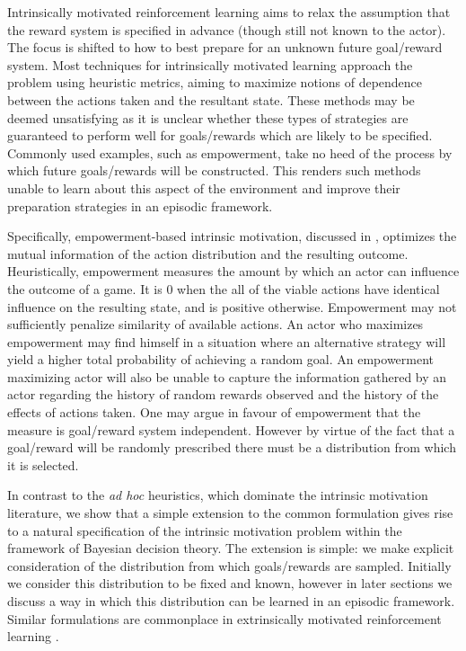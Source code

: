 \documentclass{article}
\begin{document}
Intrinsically motivated reinforcement learning aims to relax the assumption that the reward system is specified in advance (though still not known to the actor). The focus is shifted to how to best prepare for an unknown future goal/reward system. Most techniques for intrinsically motivated learning approach the problem using heuristic metrics, aiming to maximize notions of dependence between the actions taken and the resultant state. These methods may be deemed unsatisfying as it is unclear whether these types of strategies are guaranteed to perform well for goals/rewards which are likely to be specified. Commonly used examples, such as empowerment, take no heed of the process by which future goals/rewards will be constructed. This renders such methods unable to learn about this aspect of the environment and improve their preparation strategies in an episodic framework.    

Specifically, empowerment-based intrinsic motivation, discussed in \citep{mohamed2015variational}, optimizes the mutual information of the action distribution and the resulting outcome. Heuristically, empowerment measures the amount by which an actor can influence the outcome of a game. It is $0$ when the all of the viable actions have identical influence on the resulting state, and is positive otherwise. Empowerment may not sufficiently penalize similarity of available actions. An actor who maximizes empowerment may find himself in a situation where an alternative strategy will yield a higher total probability of achieving a random goal. An empowerment maximizing actor will also be unable to capture the information gathered by an actor regarding the history of random rewards observed and the history of the effects of actions taken. One may argue in favour of empowerment that the measure is goal/reward system independent. However by virtue of the fact that a goal/reward will be randomly prescribed there must be a distribution from which it is selected.  

In contrast to the \textit{ad hoc} heuristics, which dominate the intrinsic motivation literature, we show that a simple extension to the common formulation gives rise to a natural specification of the intrinsic motivation problem within the framework of Bayesian decision theory. The extension is simple: we make explicit consideration of the distribution from which goals/rewards are sampled. Initially we consider this distribution to be fixed and known, however in later sections we discuss a way in which this distribution can be learned in an episodic framework.  Similar formulations are commonplace in extrinsically motivated reinforcement learning \cite{sutton1998reinforcement}. 
\end{document}
